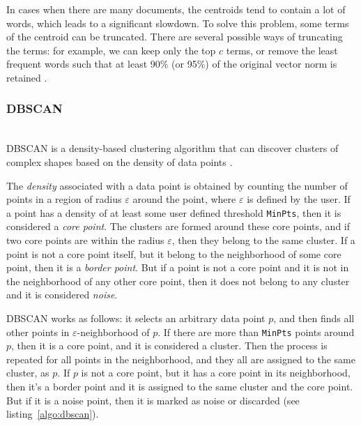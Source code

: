 
In cases when there are many documents, the centroids tend to contain a lot of words, 
which leads to a significant slowdown. To solve this problem, some terms of the 
centroid can be truncated. There are several possible ways of truncating the 
terms: for example, we can keep only the top $c$ terms, or remove the least 
frequent words such that at least 90\% (or 95\%) of the original vector norm is
retained \cite{schutze1997projections}.


\subsubsection{DBSCAN} \label{sec:dbscan} \ \\

DBSCAN is a density-based clustering algorithm that can discover
clusters of complex shapes based on the density of data points \cite{ester1996density}.

The \emph{density} associated with a data point is obtained by
counting the number of points in a region of radius $\varepsilon$
around the point, where $\varepsilon$  is defined by the user.
If a point has a density of at least some user defined
threshold \verb|MinPts|, then it is considered a \emph{core point}.
The clusters are formed around these core points, and if two core points
are within the radius $\varepsilon$, then they belong to the same cluster.
If a point is not a core point itself, but it belong to the neighborhood of some
core point, then it is a \emph{border point}. But if a point is not a core point
and it is not in the neighborhood of any other core point, then it does not
belong to any cluster and it is considered \emph{noise}.

DBSCAN works as follows: it selects an arbitrary data point $p$, and then
finds all other points in $\varepsilon$-neighborhood of $p$. If
there are more than  \verb|MinPts| points around $p$, then it is a core point,
and it is considered a cluster. Then the process is repeated for all points in
the neighborhood, and they all are assigned to the same cluster, as $p$.
If $p$ is not a core point, but it has a core point in its neighborhood, then
it's a border point and it is assigned to the same cluster and the core point.
But if it is a noise point, then it is marked as noise or discarded
(see listing~\ref{algo:dbscan}).


